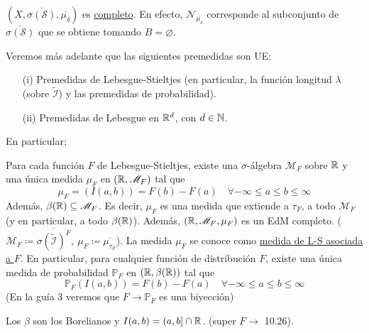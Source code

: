 \begin{remark}
	$(X,\overline{\sigma(\mathscr{S})},\overline{\mu_{\delta}})$ es \underline{completo}. En efecto, $\mathscr{N}_{\overline{\mu_{\delta}}}$ corresponde al subconjunto de $\overline{\sigma(\mathscr{S})}$ que se obtiene tomando $B=\varnothing$.
\end{remark}

\begin{remark}
	Veremos más adelante que las siguientes premedidas son UE:

	\begin{itemize}
		\item[(i)] Premedidas de Lebesgue-Stieltjes (en particular, la función longitud $\lambda$ (sobre $\widetilde{\mathcal{I}}$) y las premedidas de probabilidad).

		\item[(ii)] Premedidas de Lebesgue en $\mathbb{R}^d$, con $d \in \mathbb{N}$.
	\end{itemize}
\end{remark}

\noindent En particular;

\begin{corollary}
	Para cada función $F$ de Lebesgue-Stieltjes, existe una $\sigma$-álgebra $\mathscr{M}_F$ sobre $\mathbb{R}$ y una única medida $\mu_F$ en $(\mathbb{R},\mathscr{M}_F)$ tal que
	\[ \mu_F = (I(a,b)) = F(b) - F(a) \quad \forall -\infty \leq a \leq b \leq \infty \]
	Además, $\beta(\mathbb{R}) \subseteq \mathscr{M}_F$. Es decir, $\mu_F$ es una medida que extiende a $\tau_F$, a todo $\mathscr{M}_F$ (y en particular, a todo $\beta(\mathbb{R})$). Además, $(\mathbb{R}, \mathscr{M}_F, \mu_F)$ es un EdM completo. ($\mathscr{M}_F \coloneq \overline{\sigma(\widetilde{\mathcal{I}})^F},\ \mu_F \coloneq \overline{\mu_{\tau_F}}$). La medida $\mu_F$ se conoce como \underline{medida de L-S asociada a $F$}. En particular, para cualquier función de distribución $F$, existe una única medida de probabilidad $\mathbb{P}_F$ en $(\mathbb{R},\beta(\mathbb{R}))$ tal que 
	\[ \mathbb{P}_F(I(a,b)) = F(b) - F(a) \quad \forall -\infty \leq a \leq b \leq \infty \]
	(En la guía 3 veremos que $F \to \mathbb{P}_F$ es una biyección)
\end{corollary}

\begin{note}
	Los $\beta$ son los Borelianos y $I(a,b) = (a,b] \cap \mathbb{R}$. (super $F \to$ 10.26).
\end{note}

